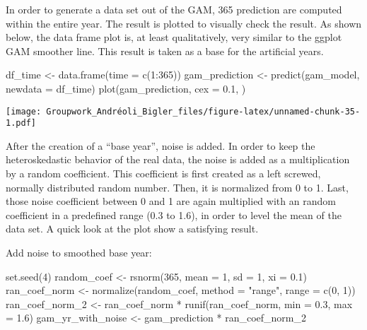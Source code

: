 \documentclass[
]{article}
\newenvironment{Shaded}{\begin{snugshade}}{\end{snugshade}}
\newcommand{\AttributeTok}[1]{\textcolor[rgb]{0.77,0.63,0.00}{#1}}
\newcommand{\DecValTok}[1]{\textcolor[rgb]{0.00,0.00,0.81}{#1}}
\newcommand{\FloatTok}[1]{\textcolor[rgb]{0.00,0.00,0.81}{#1}}
\newcommand{\FunctionTok}[1]{\textcolor[rgb]{0.00,0.00,0.00}{#1}}
\newcommand{\NormalTok}[1]{#1}
\newcommand{\OtherTok}[1]{\textcolor[rgb]{0.56,0.35,0.01}{#1}}
\newcommand{\SpecialCharTok}[1]{\textcolor[rgb]{0.00,0.00,0.00}{#1}}
\newcommand{\StringTok}[1]{\textcolor[rgb]{0.31,0.60,0.02}{#1}}
\begin{document}
In order to generate a data set out of the GAM, 365 prediction are
computed within the entire year. The result is plotted to visually check
the result. As shown below, the data frame plot is, at least
qualitatively, very similar to the ggplot GAM smoother line. This result
is taken as a base for the artificial years.

\begin{Shaded}
\begin{Highlighting}[]
\NormalTok{df\_time }\OtherTok{\textless{}{-}} \FunctionTok{data.frame}\NormalTok{(}\AttributeTok{time =} \FunctionTok{c}\NormalTok{(}\DecValTok{1}\SpecialCharTok{:}\DecValTok{365}\NormalTok{))}
\NormalTok{gam\_prediction }\OtherTok{\textless{}{-}} \FunctionTok{predict}\NormalTok{(gam\_model, }\AttributeTok{newdata =}\NormalTok{ df\_time)}
\FunctionTok{plot}\NormalTok{(gam\_prediction, }\AttributeTok{cex =} \FloatTok{0.1}\NormalTok{, )}
\end{Highlighting}
\end{Shaded}

\texttt{[image: Groupwork\_Andréoli\_Bigler\_files/figure-latex/unnamed-chunk-35-1.pdf]}

After the creation of a ``base year'', noise is added. In order to keep
the heteroskedastic behavior of the real data, the noise is added as a
multiplication by a random coefficient. This coefficient is first
created as a left screwed, normally distributed random number. Then, it
is normalized from 0 to 1. Last, those noise coefficient between 0 and 1
are again multiplied with an random coefficient in a predefined range
(0.3 to 1.6), in order to level the mean of the data set. A quick look
at the plot show a satisfying result.

Add noise to smoothed base year:

\begin{Shaded}
\begin{Highlighting}[]
\FunctionTok{set.seed}\NormalTok{(}\DecValTok{4}\NormalTok{)}
\NormalTok{random\_coef }\OtherTok{\textless{}{-}} \FunctionTok{rsnorm}\NormalTok{(}\DecValTok{365}\NormalTok{, }\AttributeTok{mean =} \DecValTok{1}\NormalTok{, }\AttributeTok{sd =} \DecValTok{1}\NormalTok{, }\AttributeTok{xi =} \FloatTok{0.1}\NormalTok{)}
\NormalTok{ran\_coef\_norm }\OtherTok{\textless{}{-}} \FunctionTok{normalize}\NormalTok{(random\_coef, }\AttributeTok{method =} \StringTok{"range"}\NormalTok{, }\AttributeTok{range =} \FunctionTok{c}\NormalTok{(}\DecValTok{0}\NormalTok{, }\DecValTok{1}\NormalTok{))}
\NormalTok{ran\_coef\_norm\_2 }\OtherTok{\textless{}{-}}\NormalTok{ ran\_coef\_norm }\SpecialCharTok{*} \FunctionTok{runif}\NormalTok{(ran\_coef\_norm, }\AttributeTok{min =} \FloatTok{0.3}\NormalTok{, }\AttributeTok{max =} \FloatTok{1.6}\NormalTok{)}
\NormalTok{gam\_yr\_with\_noise }\OtherTok{\textless{}{-}}\NormalTok{ gam\_prediction }\SpecialCharTok{*}\NormalTok{ ran\_coef\_norm\_2}
\end{Highlighting}
\end{Shaded}
\end{document}
